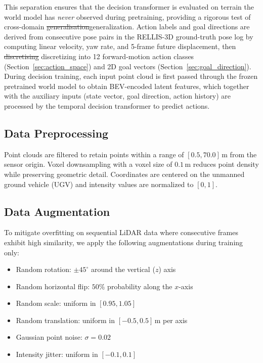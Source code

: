 \documentclass[sensors,article,submit,pdftex,moreauthors]{Definitions/mdpi}
\makeatletter
\providecommand{\DIFadd}[1]{{\protect\color{red}#1}} %
\providecommand{\DIFdel}[1]{{\protect\color{red}\sout{#1}}} %
\providecommand{\DIFaddbegin}{} %
\providecommand{\DIFaddend}{} %
\providecommand{\DIFdelbegin}{} %
\providecommand{\DIFdelend}{} %
\providecommand{\DIFscaledelfig}{0.5}
\newlength{\DIFdelgraphicswidth} %
\newlength{\DIFdelgraphicsheight} %
\providecommand{\DIFaddincludegraphics}[2][]{{\color{blue}\fbox{\DIFOincludegraphics[#1]{#2}}}} %
\providecommand{\DIFdelincludegraphics}[2][]{%
\sbox{\DIFdelgraphicsbox}{\DIFOincludegraphics[#1]{#2}}%
\settoboxwidth{\DIFdelgraphicswidth}{\DIFdelgraphicsbox} %
\settoboxtotalheight{\DIFdelgraphicsheight}{\DIFdelgraphicsbox} %
\scalebox{\DIFscaledelfig}{%
\parbox[b]{\DIFdelgraphicswidth}{\usebox{\DIFdelgraphicsbox}\\[-\baselineskip] \rule{\DIFdelgraphicswidth}{0em}}\llap{\resizebox{\DIFdelgraphicswidth}{\DIFdelgraphicsheight}{%
\setlength{\unitlength}{\DIFdelgraphicswidth}%
\begin{picture}(1,1)%
\thicklines\linethickness{2pt} %
{\color[rgb]{1,0,0}\put(0,0){\framebox(1,1){}}}%
{\color[rgb]{1,0,0}\put(0,0){\line( 1,1){1}}}%
{\color[rgb]{1,0,0}\put(0,1){\line(1,-1){1}}}%
\end{picture}%
}\hspace*{3pt}}} %
} %
\DeclareRobustCommand{\DIFaddbegin}{\DIFOaddbegin \let\includegraphics\DIFaddincludegraphics} %
\DeclareRobustCommand{\DIFaddend}{\DIFOaddend \let\includegraphics\DIFOincludegraphics} %
\DeclareRobustCommand{\DIFdelbegin}{\DIFOdelbegin \let\includegraphics\DIFdelincludegraphics} %
\DeclareRobustCommand{\DIFdelend}{\DIFOaddend \let\includegraphics\DIFOincludegraphics} %
\let\sout@orig\sout %
\renewcommand{\sout}[1]{\ifmmode\text{\sout@orig{\ensuremath{#1}}}\else\sout@orig{#1}\fi} %
\makeatother
\begin{document}
This separation ensures that the decision transformer is evaluated on terrain the world model has \emph{never} observed during pretraining, providing a rigorous test of cross-domain \DIFdelbegin \DIFdel{generalisation}\DIFdelend \DIFaddbegin \DIFadd{generalization}\DIFaddend . Action labels and goal directions are derived from consecutive pose pairs in the RELLIS-3D ground-truth pose log by computing linear velocity, yaw rate, and 5-frame future displacement, then \DIFdelbegin \DIFdel{discretising }\DIFdelend \DIFaddbegin \DIFadd{discretizing }\DIFaddend into 12 forward-motion action classes (Section~\ref{sec:action_space}) and 2D goal vectors (Section~\ref{sec:goal_direction}). During decision training, each input point cloud is first passed through the frozen pretrained world model to obtain BEV-encoded latent features, which together with the auxiliary inputs (state vector, goal direction, action history) are processed by the temporal decision transformer to predict actions.

\subsection{Data Preprocessing}

Point clouds are filtered to retain points within a range of $[0.5, 70.0]$\,m from the sensor origin. Voxel downsampling with a voxel size of $0.1$\,m reduces point density while preserving geometric detail. Coordinates are centered on the unmanned ground vehicle (UGV) and intensity values are normalized to $[0, 1]$.

\subsection{Data Augmentation}

To mitigate overfitting on sequential LiDAR data where consecutive frames exhibit high similarity, we apply the following augmentations during training only:
\begin{itemize}
    \item Random rotation: $\pm 45^\circ$ around the vertical ($z$) axis
    \item Random horizontal flip: $50\%$ probability along the $x$-axis
    \item Random scale: uniform in $[0.95, 1.05]$
    \item Random translation: uniform in $[-0.5, 0.5]$\,m per axis
    \item Gaussian point noise: $\sigma = 0.02$
    \item Intensity jitter: uniform in $[-0.1, 0.1]$
\end{itemize}
\end{document}
